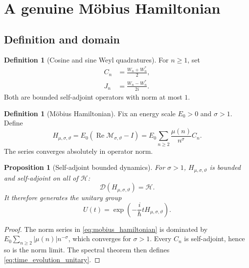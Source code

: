 \documentclass[11pt]{amsart}
\numberwithin{equation}{section}
\theoremstyle{plain}
\newtheorem{proposition}[theorem]{Proposition}
\theoremstyle{definition}
\newtheorem{definition}[theorem]{Definition}
\theoremstyle{remark}
\newcommand{\Hil}{\mathcal{H}}
\newcommand{\Dom}{\mathcal{D}}
\newcommand{\Reop}{\operatorname{Re}}
\begin{document}
\section{A genuine M\"obius Hamiltonian}
\label{sec:dynamics}

\subsection{Definition and domain}
\label{subsec:hamiltonian_definition}

\begin{definition}[Cosine and sine Weyl quadratures]
\label{def:Weyl_quadratures}
For $n\ge1$, set
\begin{align}
C_n
&=\frac{W_n+W_n^*}{2},
\label{eq:Cn_definition}\\
J_n
&=\frac{W_n-W_n^*}{2i}.
\label{eq:Jn_definition}
\end{align}
Both are bounded self-adjoint operators with norm at most $1$.
\end{definition}

\begin{definition}[M\"obius Hamiltonian]
\label{def:mobius_hamiltonian}
Fix an energy scale $E_0>0$ and $\sigma>1$.  Define
\begin{equation}
H_{\mu,\sigma,\vartheta}
=
E_0\left(\Reop\mathcal M_{\sigma,\vartheta}-I\right)
=
E_0\sum_{n\ge2}
\frac{\mu(n)}{n^{\sigma}}C_n.
\label{eq:mobius_hamiltonian}
\end{equation}
The series converges absolutely in operator norm.
\end{definition}

\begin{proposition}[Self-adjoint bounded dynamics]
\label{prop:hamiltonian_selfadjoint}
For $\sigma>1$, $H_{\mu,\sigma,\vartheta}$ is bounded and self-adjoint on
all of $\Hil$:
\begin{equation}
\Dom(H_{\mu,\sigma,\vartheta})=\Hil.
\label{eq:hamiltonian_domain}
\end{equation}
It therefore generates the unitary group
\begin{equation}
U(t)=\exp\!\left(-\frac{i}{\hbar}tH_{\mu,\sigma,\vartheta}\right).
\label{eq:time_evolution_unitary}
\end{equation}
\end{proposition}

\begin{proof}
The norm series in \eqref{eq:mobius_hamiltonian} is dominated by
$E_0\sum_{n\ge2}|\mu(n)|n^{-\sigma}$, which converges for $\sigma>1$.
Every $C_n$ is self-adjoint, hence so is the norm limit.  The spectral theorem
then defines \eqref{eq:time_evolution_unitary}.
\end{proof}
\end{document}
